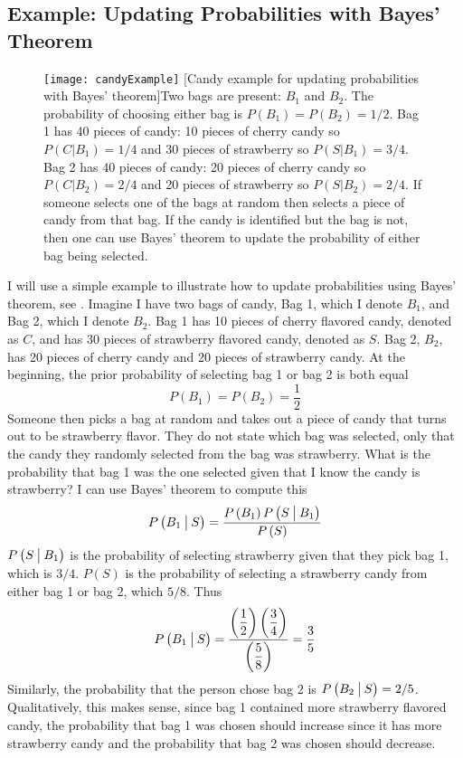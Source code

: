 \subsection{Example: Updating Probabilities with Bayes' Theorem}

\begin{figure}
	\texttt{[image: candyExample]}
	[Candy example for updating probabilities with Bayes' theorem]{Two bags are present: $B_1$ and $B_2$. The probability of choosing either bag is $P(B_1) = P(B_2) = 1/2$. Bag 1 has 40 pieces of candy: 10 pieces of cherry candy so $P(C|B_1) = 1/4$ and 30 pieces of strawberry so $P(S|B_1) = 3/4$. Bag 2 has 40 pieces of candy: 20 pieces of cherry candy so $P(C|B_2) = 2/4$ and 20 pieces of strawberry so $P(S|B_2) = 2/4$. If someone selects one of the bags at random then selects a piece of candy from that bag. If the candy is identified but the bag is not, then one can use Bayes' theorem to update the probability of either bag being selected. }
	\label{fig:candyExample}
\end{figure}

I will use a simple example to illustrate how to update probabilities using Bayes' theorem, see . Imagine I have two bags of candy, Bag 1, which I denote $B_1$, and Bag 2, which I denote $B_2$. Bag 1 has 10 pieces of cherry flavored candy, denoted as $C$, and has 30 pieces of strawberry flavored candy, denoted as $S$. Bag 2, $B_2$, has 20 pieces of cherry candy and 20 pieces of strawberry candy. At the beginning, the prior probability of selecting bag 1 or bag 2 is both equal
%
\begin{equation}
	P \left( B_1 \right) = P \left( B_2 \right) = \frac{1}{2}
\end{equation}
%
Someone then picks a bag at random and takes out a piece of candy that turns out to be strawberry flavor. They do not state which bag was selected, only that the candy they randomly selected from the bag was strawberry. What is the probability that bag 1 was the one selected given that I know the candy is strawberry? I can use Bayes' theorem to compute this
%
\begin{equation}
	P \left( B_1 \given[\big] S \right) = \frac{ P \left( B_1 \right) P \left( S \given[\big] B_1 \right) }{ P \left( S \right) }
\end{equation}
%
$ P \left( S \given[\big] B_1 \right) $ is the probability of selecting strawberry given that they pick bag 1, which is $3/4$. $ P \left( S \right) $ is the probability of selecting a strawberry candy from either bag 1 or bag 2, which $5/8$. Thus
%
\begin{equation}
	P \left( B_1 \given[\big] S \right) = \dfrac {\left( \dfrac {1} {2}\right) \left( \dfrac {3} {4}\right) } {\left( \dfrac {5} {8}\right) } = \frac{3}{5}
\end{equation}
%
Similarly, the probability that the person chose bag 2 is $P \left( B_2 \given[\big] S \right) = 2/5$. Qualitatively, this makes sense, since bag 1 contained more strawberry flavored candy, the probability that bag 1 was chosen should increase since it has more strawberry candy and the probability that bag 2 was chosen should decrease.


